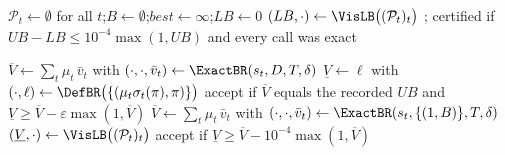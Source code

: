 \documentclass{llncs}
\begin{document}
\begin{algorithm}[h]
\caption{Visible variant: one trap set known to the attacker}\label{alg:vis}
$\mathcal P_t\gets\emptyset$ for all $t$;\quad $B\gets\emptyset$;\quad $\mathit{best}\gets\infty$;\quad $LB\gets0$\;
$(LB,\cdot)\gets\VisLB\bigl((\mathcal P_t)_t\bigr)$\;
; certified if $UB-LB\le10^{-4}\max(1,UB)$ and every \ExactBR call was exact\;
\end{algorithm}

\begin{algorithm}[h]
\caption{Independent verification of a stored certificate}\label{alg:verify}
$\overline{V}\gets\sum_t\mu_t\,\bar v_t$ with $(\cdot,\cdot,\bar v_t)\gets\ExactBR(s_t,D,T,\delta)$ 
$\underline{V}\gets\ell$ with $(\cdot,\ell)\gets\DefBR\bigl(\{(\mu_t\sigma_t(\pi),\pi)\}\bigr)$ 
accept if $\overline V$ equals the recorded $UB$ and $\underline V\ge\overline V-\varepsilon\max(1,\overline V)$\;
$\overline{V}\gets\sum_t\mu_t\,\bar v_t$ with $(\cdot,\cdot,\bar v_t)\gets\ExactBR(s_t,\{(1,B)\},T,\delta)$\;
$(\underline V,\cdot)\gets\VisLB\bigl((\mathcal P_t)_t\bigr)$\;
accept if $\underline V\ge\overline V-10^{-4}\max(1,\overline V)$\;
\end{algorithm}
\end{document}
